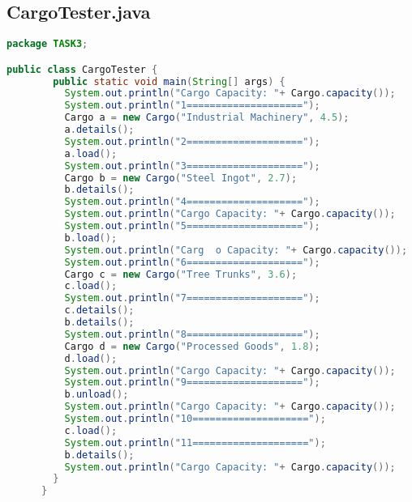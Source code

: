 \documentclass[11pt,a4paper]{article}
\begin{document}
\subsection*{CargoTester.java}
\begin{lstlisting}[style=codestyle,language=Java]
package TASK3;

public class CargoTester {
        public static void main(String[] args) {
          System.out.println("Cargo Capacity: "+ Cargo.capacity());
          System.out.println("1====================");
          Cargo a = new Cargo("Industrial Machinery", 4.5);
          a.details();
          System.out.println("2====================");
          a.load();
          System.out.println("3====================");
          Cargo b = new Cargo("Steel Ingot", 2.7);
          b.details();
          System.out.println("4====================");
          System.out.println("Cargo Capacity: "+ Cargo.capacity());
          System.out.println("5====================");
          b.load();
          System.out.println("Carg  o Capacity: "+ Cargo.capacity());
          System.out.println("6====================");
          Cargo c = new Cargo("Tree Trunks", 3.6);
          c.load();
          System.out.println("7====================");
          c.details();
          b.details();
          System.out.println("8====================");
          Cargo d = new Cargo("Processed Goods", 1.8);
          d.load();
          System.out.println("Cargo Capacity: "+ Cargo.capacity());
          System.out.println("9====================");
          b.unload();
          System.out.println("Cargo Capacity: "+ Cargo.capacity());
          System.out.println("10====================");
          c.load();
          System.out.println("11====================");
          b.details();
          System.out.println("Cargo Capacity: "+ Cargo.capacity());
        }
      }
      

\end{lstlisting}
\end{document}

